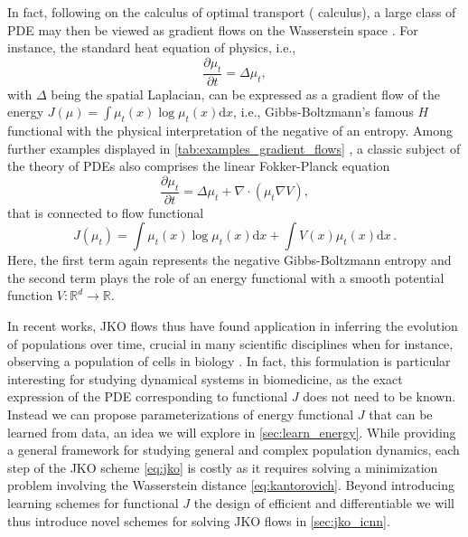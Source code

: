 In fact, following \citet{otto2001geometry} on the calculus of optimal transport (\citeauthor{otto2001geometry} calculus), a large class of \acrlong{PDE} may then be viewed as gradient flows on the Wasserstein space \citep{jordan1998variational}.
For instance, the standard heat equation of physics, i.e.,
\begin{equation*}
	\frac{\partial \mu_t}{\partial t} = \Delta \mu_t,
\end{equation*}
with $\Delta$ being the spatial Laplacian, can be expressed as a gradient flow of the energy $J(\mu) = \int \mu_t(x) \log \mu_t(x) \mathrm{d} x$, i.e., Gibbs-Boltzmann's famous $H$ functional with the physical interpretation of the negative of an entropy.
Among further examples displayed in \cref{tab:examples_gradient_flows} \citep{alvarez2021optimizing, villani2021topics}, a classic subject of the theory of PDEs also comprises the linear Fokker-Planck equation
\begin{equation}
	\label{eq:linear_fokker_planck}
	\frac{\partial \mu_t}{\partial t} = \Delta \mu_t+\nabla \cdot(\mu_t \nabla V),
\end{equation}
that is connected to flow functional
\begin{equation*}
	J(\mu_t) = \int \mu_t(x) \log \mu_t(x) \mathrm{d} x+\int V(x) \mu_t(x) \mathrm{d}x\,.
\end{equation*}
Here, the first term again represents the negative Gibbs-Boltzmann entropy and the second term plays the role of an energy functional with a smooth potential function $V : \mathbb{R}^d \rightarrow \mathbb{R}$.


In recent works, \acrshort{JKO} flows thus have found application in inferring the evolution of populations over time, crucial in many scientific disciplines when for instance, observing a population of cells in biology \citep{bunne2022proximal, alvarez2021optimizing, mokrov2021large, benamou2016augmented}.
In fact, this formulation is particular interesting for studying dynamical systems in biomedicine, as the exact expression of the PDE corresponding to functional $J$ does not need to be known.
Instead we can propose parameterizations of energy functional $J$ that can be learned from data, an idea we will explore in \cref{sec:learn_energy}.
While providing a general framework for studying general and complex population dynamics, each step of the JKO scheme \eqref{eq:jko} is costly as it requires solving a minimization problem involving the Wasserstein distance \eqref{eq:kantorovich}. Beyond introducing learning schemes for functional $J$ the design of efficient and differentiable we will thus introduce novel schemes for solving JKO flows in \cref{sec:jko_icnn}.


